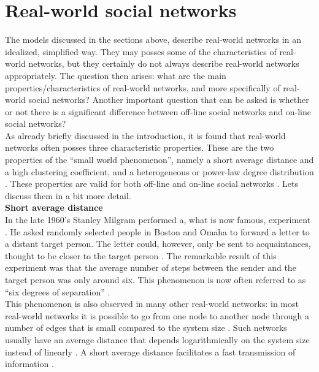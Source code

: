 \documentclass[11 pt , letterpaper , twoside , openright]{book}
\begin{document}
\section{Real-world social networks}
The models discussed in the sections above, describe real-world networks in an idealized, simplified way. They may posses some of the characteristics of real-world networks, but they certainly do not always describe real-world networks appropriately. The question then arises: what are the main properties/characteristics of real-world networks, and more specifically of real-world social networks? Another important question that can be asked is whether or not there is a significant difference between off-line social networks and on-line social networks?\\
As already briefly discussed in the introduction, it is found that real-world networks often posses three characteristic properties. These are the two properties of the ``small world phenomenon'', namely a short average distance and a high clustering coefficient, and a heterogeneous or power-law degree distribution \cite{RealWorld}. These properties are valid for both off-line and on-line social networks \cite{Zhang2014}. Lets discuss them in a bit more detail.\\
\newline
\textbf{Short average distance}\\
\newline
In the late 1960's Stanley Milgram performed a, what is now famous, experiment \cite{Newman2003}. He asked randomly selected people in Boston and Omaha to forward a letter to a distant target person. The letter could, however, only be sent to acquaintances, thought to be closer to the target person \cite{RealWorld}. The remarkable result of this experiment was that the average number of steps between the sender and the target person was only around six. This phenomenon is now often referred to as ``six degrees of separation'' \cite{RealWorld}.\\
This phenomenon is also observed in many other real-world networks: in most real-world networks it is possible to go from one node to another node through a number of edges that is small compared to the system size \cite{RealWorld}. Such networks usually have an average distance that depends logarithmically on the system size instead of linearly \cite{Newman2003}. A short average distance facilitates a fast transmission of information \cite{Newman2003}\cite{Zhang2014}.\\
\newline
\end{document}
